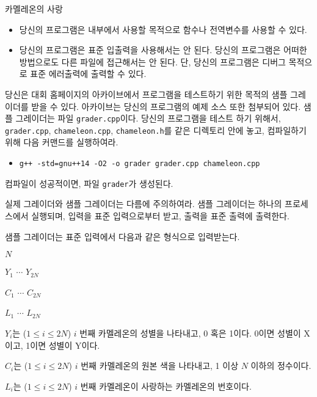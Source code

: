 \begin{problem}{카멜레온의 사랑}
\begin{itemize}
\begin{itemize}
		\end{itemize}
		
	\end{itemize}
	
	\Notes
	
	\begin{itemize}
		\item 당신의 프로그램은 내부에서 사용할 목적으로 함수나 전역변수를 사용할 수 있다.
		\item 당신의 프로그램은 표준 입출력을 사용해서는 안 된다. 당신의 프로그램은 어떠한 방법으로도 다른 파일에 접근해서는 안 된다. 단, 당신의 프로그램은 디버그 목적으로 표준 에러출력에 출력할 수 있다.
	\end{itemize}
	
	당신은 대회 홈페이지의 아카이브에서 프로그램을 테스트하기 위한 목적의 샘플 그레이더를 받을 수 있다. 아카이브는 당신의 프로그램의 예제 소스 또한 첨부되어 있다.
	샘플 그레이더는 파일 \texttt{grader.cpp}이다. 당신의 프로그램을 테스트 하기 위해서, \texttt{grader.cpp}, \texttt{chameleon.cpp}, \texttt{chameleon.h}를 같은 디렉토리 안에 놓고, 컴파일하기 위해 다음 커맨드를 실행하여라.
	
	\begin{itemize}
		\item \texttt{g++ -std=gnu++14 -O2 -o grader grader.cpp chameleon.cpp}
	\end{itemize}
	
	컴파일이 성공적이면, 파일 \texttt{grader}가 생성된다.
	
	실제 그레이더와 샘플 그레이더는 다름에 주의하여라. 샘플 그레이더는 하나의 프로세스에서 실행되며, 입력을 표준 입력으로부터 받고, 출력을 표준 출력에 출력한다.
	
	\InputFile
	
	샘플 그레이더는 표준 입력에서 다음과 같은 형식으로 입력받는다.
	
	$N$
	
	$Y_1$ $\cdots$ $Y_{2N}$
	
	$C_1$ $\cdots$ $C_{2N}$
	
	$L_1$ $\cdots$ $L_{2N}$


	$Y_i$는 ($1 \le i \le 2N$) $i$ 번째 카멜레온의 성별을 나타내고, 0 혹은 1이다. 0이면 성별이 X이고, 1이면 성별이 Y이다.
	
	$C_i$는 ($1 \le i \le 2N$) $i$ 번째 카멜레온의 원본 색을 나타내고, 1 이상 $N$ 이하의 정수이다.
	
	$L_i$는 ($1 \le i \le 2N$) $i$ 번째 카멜레온이 사랑하는 카멜레온의 번호이다.
	
	\OutputFile
	

\end{problem}
